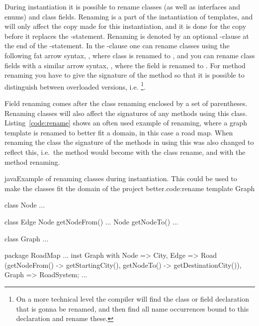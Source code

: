 During instantiation it is possible to rename classes (as well as interfaces and enums) and class fields.
Renaming is a part of the instantiation of templates, and will only affect the copy made for this instantiation, and it is done for the copy before it replaces the -statement.
Renaming is denoted by an optional -clause at the end of the -statement.
In the -clause one can rename classes using the following fat arrow syntax, , where class  is renamed to , and you can rename class fields with a similar arrow syntax, , where the field  is renamed to .
For method renaming you have to give the signature of the method so that it is possible to distinguish between overloaded versions, i.e. \footnote{On a more technical level the compiler will find the class or field declaration that is gonna be renamed, and then find all name occurrences bound to this declaration and rename these.}.

Field renaming comes after the class renaming enclosed by a set of parentheses.
Renaming classes will also affect the signatures of any methods using this class.
Listing~\vref{code:rename} shows an often used example of renaming, where a graph template is renamed to better fit a domain, in this case a road map.
When renaming the class  the signature of the methods in  using this  was also changed to reflect this, i.e.\ the method  would become  with the class rename, and  with the method renaming.

\begin{code}{java}{Example of renaming classes during instantiation. This could be used to make the classes fit the domain of the project better.}{code:rename}
template Graph {
    class Node {
        ...
    }

    class Edge {
        Node getNodeFrom() { ... }
        Node getNodeTo() { ... }
    }

    class Graph {
        ...
    }
}

package RoadMap {
    ...
    inst Graph with
        Node => City,
        Edge => Road
            (getNodeFrom() -> getStartingCity(),
            getNodeTo() -> getDestinationCity()),
        Graph => RoadSystem;
    ...
}

\end{code}

